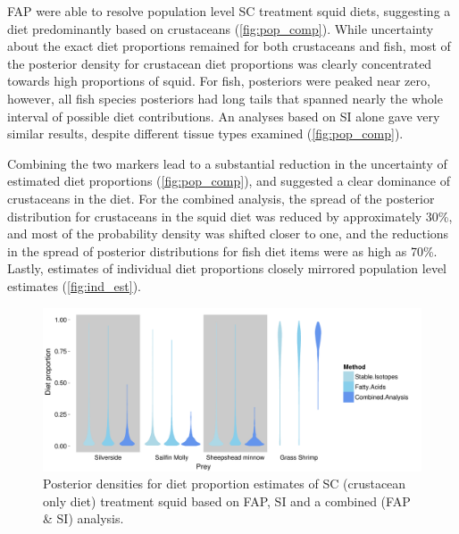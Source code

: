 \documentclass{article}%
\begin{document}
\begin{spacing}{1.9}
\begin{flushleft}
FAP were able to resolve population level SC treatment squid diets,
suggesting a diet predominantly based on crustaceans
(\autoref{fig:pop_comp}). While uncertainty about the exact diet
proportions remained for both crustaceans and fish, most of the
posterior density for crustacean diet proportions was clearly
concentrated towards high
proportions of squid. For fish, posteriors were peaked near zero,
however, all fish species posteriors had long tails that spanned
nearly the whole interval of possible diet contributions. An analyses
based on SI alone gave very similar results, despite different tissue
types examined (\autoref{fig:pop_comp}). 

Combining the two markers lead to a substantial reduction in the
uncertainty of estimated diet proportions (\autoref{fig:pop_comp}),
and suggested a clear dominance of crustaceans in the diet. For the
combined analysis, the spread of the posterior distribution for crustaceans in the
squid diet was reduced by approximately 30\%, and most of the
probability density was shifted closer to one, and the reductions in
the spread of posterior distributions for fish diet items were as high
as 70\%. Lastly, estimates of individual diet proportions closely
mirrored population level estimates (\autoref{fig:ind_est}).

\begin{figure}
  \begin{center}
    \includegraphics[width=1\textwidth]{figures/Comp_plot_violin.pdf}
    \caption{Posterior densities for diet proportion estimates of SC (crustacean only diet)
      treatment squid based on FAP, SI and a combined (FAP \& SI) analysis.}
    \label{fig:pop_comp}
  \end{center}
\end{figure}



\end{flushleft}
\end{spacing}
\end{document}
